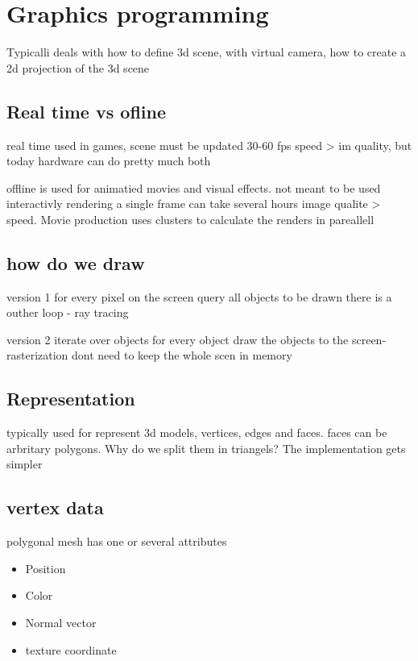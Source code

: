 

\section{Graphics programming}
Typicalli deals with how to define 3d scene, with virtual camera, how to create a 2d projection of the 3d scene

\subsection*{Real time vs ofline}
real time used in games, scene must be updated 30-60 fps
speed > im quality, but today hardware can do pretty much both

offline is used for animatied movies and visual effects. not meant to be used interactivly 
rendering a single frame can take several hours 
image qualite > speed. Movie production uses clusters to calculate the renders in pareallell

\subsection*{how do we draw}
version 1
for every pixel on the screen query all objects to be drawn there is a outher loop - ray tracing


version 2
iterate over objects
for every object draw the objects to the screen- rasterization
dont need to keep the whole scen in memory

\subsection*{Representation}

typically used for represent 3d models, vertices, edges and faces. faces can be arbritary polygons. Why do we split them in triangels? The implementation gets simpler 

\subsection*{vertex data}
polygonal mesh has one or several attributes 

\begin{itemize}
	\item Position
	\item Color
	\item Normal vector
	\item texture coordinate
\end{itemize}

